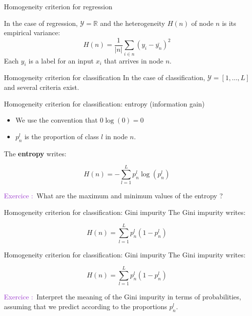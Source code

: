 \documentclass[usenames,dvipsnames]{beamer}
\newcounter{numexos}%
\newcommand{\exercice}[1]{%
\addtocounter{numexos}{1}%
\textcolor{DarkOrchid}{Exercice\,\thenumexos\,:}\,#1%
}
\begin{document}
\begin{frame}{Homogeneity criterion for regression}

    In the case of regression, $ \mathcal{Y}  = \mathbb{R} $ and the heterogeneity $H(n)$ of node $n$ is its empirical variance:
    \begin{equation}
	H(n) = \frac{1}{|n|} \sum_{i\in n} (y_i - \bar{y_n})^2
    \end{equation}
    Each $y_i$ is a label for an input $x_i$ that arrives in node $n$.
    
\end{frame}

\begin{frame}{Homogeneity criterion for classification}
    In the case of classification, $ \mathcal{Y}  = [1, \dots, L]$ and several criteria exist.  
\end{frame}

\begin{frame}{Homogeneity criterion for classification: entropy (information gain)}
    \begin{itemize}
        \item We use the convention that $ 0 \log (0) = 0$
	\item $p_n^l$ is the proportion of class $ l$ in node $n$.
    \end{itemize}
    The \textbf{{entropy}} writes:

    \begin{equation}
	H(n) = - \sum^{L}_{l=1} p_n^l\log( p_n^l)
    \end{equation}

    \exercice{\textbf{}}What are the maximum and minimum values of the entropy ?
\end{frame}

\begin{frame}{Homogeneity criterion for classification: Gini impurity}
    The Gini impurity writes:

    \begin{equation}
	H(n) = \sum^{L}_{l=1} p_n^l(1-p_n^l)
    \end{equation}
\end{frame}

\begin{frame}{Homogeneity criterion for classification: Gini impurity}
    The Gini impurity writes:

    \begin{equation}
	H(n) = \sum^{L}_{l=1} p_n^l(1-p_n^l)
    \end{equation}
    \exercice{\textbf{}}Interpret the meaning of the Gini impurity in terms of probabilities, assuming that we predict according to the proportions $p_n^l$.
\end{frame}
\end{document}
